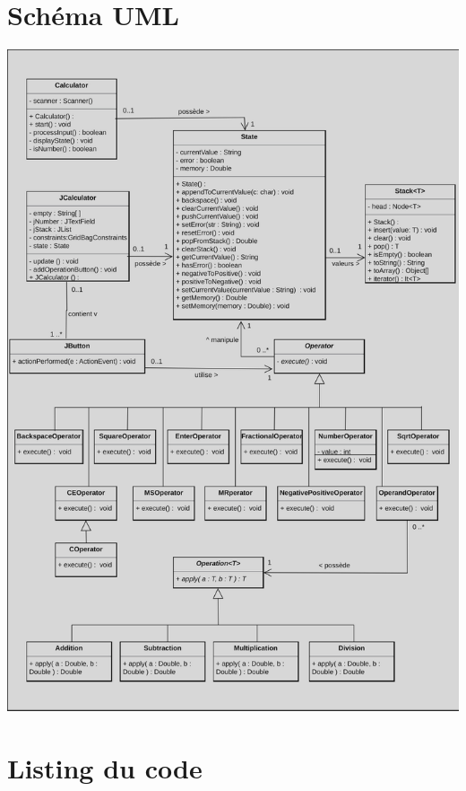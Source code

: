\documentclass[12pt]{report}
\begin{document}
    \section*{Schéma UML}
    \includegraphics[scale=0.3]{images/diagram}

    \section*{Listing du code}
    
    
    
    
    
\end{document}
